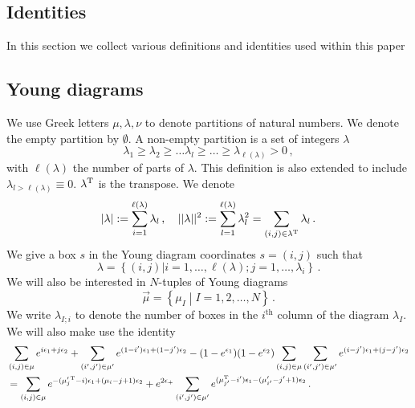 \documentclass[main.tex]{subfiles}
\begin{document}
\begin{subappendices}
\section{Identities}
In this section we collect various definitions and identities used within this paper
\subsection{Young diagrams}\label{eqn:Youngdiags}
We use Greek letters $\mu,\lambda,\nu$ to denote partitions of natural numbers. We denote the empty partition by $\emptyset$. A non-empty partition is a set of integers $\lambda$
\begin{equation}
\lambda_1\geq\lambda_2\geq\dots\lambda_l\geq\dots\geq\lambda_{\ell(\lambda)}>0\,,
\end{equation}
with $\ell(\lambda)$ the number of parts of $\lambda$. This definition is also extended to include $\lambda_{l >\ell(\lambda)}\equiv0$. $\lambda^{\operatorname{T}}$ is the transpose.
We denote
\begin{equation}
|\lambda|:=\sum_{i=1}^{\ell(\lambda)}\lambda_l\,,\quad ||\lambda||^2:=\sum_{l=1}^{\ell(\lambda)}\lambda^2_l=\sum_{(i,j)\in\lambda^{\operatorname{T}}}\lambda_l\,.
\end{equation}
We give a box $s$ in the Young diagram coordinates $s=(i,j)$ such that
\begin{equation}
\lambda=\left\{(i,j)|i=1,\dots,\ell(\lambda);j=1,\dots,\lambda_i\right\}\,.
\end{equation}
We will also be interested in $N$-tuples of Young diagrams
\begin{equation}
\vec{\mu}=\left\{\mu_I\middle|I=1,2,\dots,N\right\}\,.
\end{equation}
We write $\lambda_{I;i}$ to denote the number of boxes in the $i^{\text{th}}$ column of the diagram $\lambda_I$.
We will also make use the identity \cite{Nakajima:2003pg,Hosomichi:2014rqa}
\begin{equation}\label{eqn:youngsimp}
\begin{aligned}
&\sum_{(i,j)\in \mu}e^{i\epsilon_1+j\epsilon_2}+\sum_{(i',j')\in \mu'}e^{(1-i')\epsilon_1+(1-j')\epsilon_2}-(1-e^{\epsilon_1})(1-e^{\epsilon_2})\sum_{(i,j)\in\mu}\sum_{(i',j')\in \mu'}e^{(i-j')\epsilon_1+(j-j')\epsilon_2}\\
&=\sum_{(i,j)\in \mu}e^{-(\mu'^{\operatorname{T}}_{j}-i)\epsilon_1+(\mu_{i}-j+1)\epsilon_2}+e^{2\epsilon_+}\sum_{(i',j')\in \mu'}e^{(\mu^{\operatorname{T}}_{j'}-i')\epsilon_1-(\mu'_{i'}-j'+1)\epsilon_2}\,.
\end{aligned}
\end{equation}

\end{subappendices}
\end{document}
